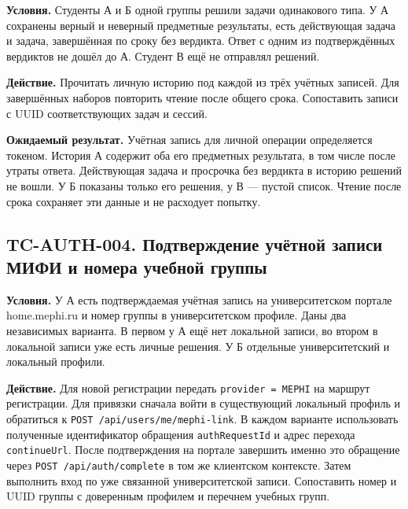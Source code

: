 \documentclass[12pt,a4paper]{article}
\begin{document}
\hypertarget{tc-auth-003-свой-профиль-и-своя-история}{}

\hypertarget{tc-auth-003}{}

\textbf{Условия.} Студенты А и Б одной группы решили задачи одинакового типа. У А сохранены верный и неверный предметные результаты, есть действующая задача и задача, завершённая по сроку без вердикта. Ответ с одним из подтверждённых вердиктов не дошёл до А. Студент В ещё не отправлял решений.

\textbf{Действие.} Прочитать личную историю под каждой из трёх учётных записей. Для завершённых наборов повторить чтение после общего срока. Сопоставить записи с UUID соответствующих задач и сессий.

\textbf{Ожидаемый результат.} Учётная запись для личной операции определяется токеном. История А содержит оба его предметных результата, в том числе после утраты ответа. Действующая задача и просрочка без вердикта в историю решений не вошли. У Б показаны только его решения, у В --- пустой список. Чтение после срока сохраняет эти данные и не расходует попытку.

\subsection{TC-AUTH-004. Подтверждение учётной записи МИФИ и номера учебной группы}\label{tc-auth-004-ux43fux43eux434ux442ux432ux435ux440ux436ux434ux435ux43dux438ux435-ux443ux447ux451ux442ux43dux43eux439-ux437ux430ux43fux438ux441ux438-ux43cux438ux444ux438-ux438-ux43dux43eux43cux435ux440ux430-ux443ux447ux435ux431ux43dux43eux439-ux433ux440ux443ux43fux43fux44b}

\hypertarget{tc-auth-004-подтверждение-учётной-записи-мифи-и-номера-учебной-группы}{}

\hypertarget{tc-auth-004}{}

\textbf{Условия.} У А есть подтверждаемая учётная запись на университетском портале home.mephi.ru и номер группы в университетском профиле. Даны два независимых варианта. В первом у А ещё нет локальной записи, во втором в локальной записи уже есть личные решения. У Б отдельные университетский и локальный профили.

\textbf{Действие.} Для новой регистрации передать \texttt{provider\ =\ MEPHI} на маршрут регистрации. Для привязки сначала войти в существующий локальный профиль и обратиться к \texttt{POST /\allowbreak{}api/\allowbreak{}users/\allowbreak{}me/\allowbreak{}mephi-\allowbreak{}link}. В каждом варианте использовать полученные идентификатор обращения \texttt{auth\allowbreak{}Request\allowbreak{}Id} и адрес перехода \texttt{continue\allowbreak{}Url}. После подтверждения на портале завершить именно это обращение через \texttt{POST /\allowbreak{}api/\allowbreak{}auth/\allowbreak{}complete} в том же клиентском контексте. Затем выполнить вход по уже связанной университетской записи. Сопоставить номер и UUID группы с доверенным профилем и перечнем учебных групп.
\end{document}
